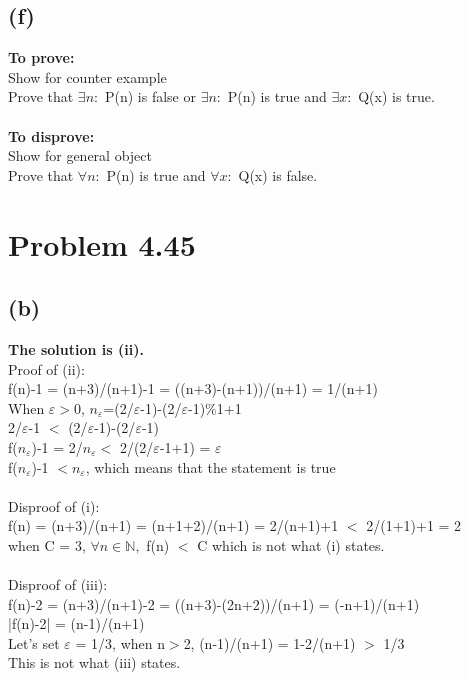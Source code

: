 \documentclass{article}
\begin{document}
\subsection*{(f)}
\textbf{To prove:}\\
Show for counter example\\
Prove that $\exists n: $ P(n) is false or $\exists n: $ P(n) is true and $\exists x: $ Q(x) is true.\\\\
\textbf{To disprove:}\\
Show for general object\\
Prove that $\forall n: $ P(n) is true and $\forall x: $ Q(x) is false.

\newpage
\section*{Problem 4.45}
\subsection*{(b)}
\textbf{The solution is (ii).}\\
Proof of (ii):\\
f(n)-1 = (n+3)/(n+1)-1 = ((n+3)-(n+1))/(n+1) = 1/(n+1)\\
When $\varepsilon>$0, $n_\varepsilon$=(2/$\varepsilon$-1)-(2/$\varepsilon$-1)\%1+1\\
2/$\varepsilon$-1 $<$ (2/$\varepsilon$-1)-(2/$\varepsilon$-1)\\
f($n_\varepsilon$)-1 = 2/$n_\varepsilon < $ 2/(2/$\varepsilon$-1+1) = $\varepsilon$\\
f($n_\varepsilon$)-1 $< n_\varepsilon$, which means that the statement is true\\\\
Disproof of (i):\\
f(n) = (n+3)/(n+1) = (n+1+2)/(n+1) = 2/(n+1)+1 $<$ 2/(1+1)+1 = 2\\
when C = 3, $\forall n\in \mathbb{N},$ f(n) $<$ C which is not what (i) states.\\\\
Disproof of (iii):\\
f(n)-2 = (n+3)/(n+1)-2 = ((n+3)-(2n+2))/(n+1) = (-n+1)/(n+1)\\
|f(n)-2| = (n-1)/(n+1)\\
Let's set $\varepsilon$ = 1/3, when n$>$2, (n-1)/(n+1) = 1-2/(n+1) $>$ 1/3\\
This is not what (iii) states.\\\\
\end{document}
